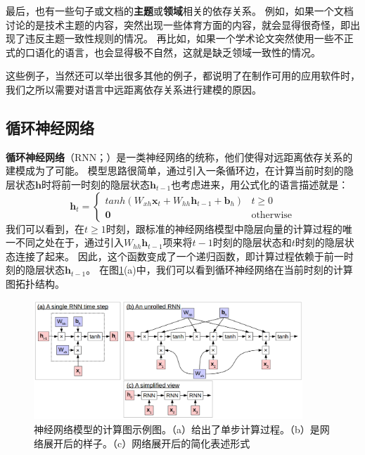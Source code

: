 \documentclass[10pt,a4paper]{ctexart}
\begin{document}
最后，也有一些句子或文档的\textbf{主题}或\textbf{领域}相关的依存关系。
例如，如果一个文档讨论的是技术主题的内容，突然出现一些体育方面的内容，就会显得很奇怪，即出现了违反主题一致性规则的情况。
再比如，如果一个学术论文突然使用一些不正式的口语化的语言，也会显得极不自然，这就是缺乏领域一致性的情况。

这些例子，当然还可以举出很多其他的例子，都说明了在制作可用的应用软件时，我们之所以需要对语言中远距离依存关系进行建模的原因。

\subsection{循环神经网络}
\textbf{循环神经网络}（RNN；\cite{elman1990finding}）是一类神经网络的统称，他们使得对远距离依存关系的建模成为了可能。
模型思路很简单，通过引入一条循环边，在计算当前时刻的隐层状态$\textbf{h}$时将前一时刻的隐层状态$\textbf{h}_{t-1}$也考虑进来，用公式化的语言描述就是：
\begin{equation}\label{eq:44}
 \textbf{h}_t = \left\{ \begin{array}{ll}
  tanh(W_{xh}\textbf{x}_t + W_{hh}\textbf{h}_{t-1}+\textbf{b}_h) & t \geq 0 \\
  \textbf{0} & \textrm{otherwise}
  \end{array} \right.
\end{equation}
我们可以看到，在$t \geq 1$时刻，跟标准的神经网络模型中隐层向量的计算过程的唯一不同之处在于，通过引入$W_{hh}\textbf{h}_{t-1}$项来将$t-1$时刻的隐层状态和$t$时刻的隐层状态连接了起来。
因此，这个函数变成了一个递归函数，即计算过程依赖于前一时刻的隐层状态$\textbf{h}_{t-1}$。
在图\ref{fig:15}(a)中，我们可以看到循环神经网络在当前时刻的计算图拓扑结构。

\begin{figure}[H]
\centering
\includegraphics[width=0.9\textwidth]{fig15.png}
\caption{神经网络模型的计算图示例图。（a）给出了单步计算过程。（b）是网络展开后的样子。（c）网络展开后的简化表述形式}
\label{fig:15}
\end{figure}
\end{document}
